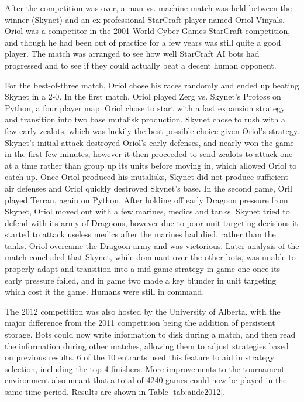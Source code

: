 \documentclass[journal]{IEEEtran}
\begin{document}
After the competition was over, a man vs. machine match was held between the winner (Skynet) and an
ex-professional StarCraft player named Oriol Vinyals. Oriol was a competitor in the 2001 World Cyber
Games StarCraft competition, and though he had been out of practice for a few years was still quite a
good player. The match was arranged to see how well StarCraft AI bots had progressed and to see if
they could actually beat a decent human opponent. 

For the best-of-three match, Oriol chose his races randomly and ended up beating Skynet in a 2-0. 
In the first match, Oriol played Zerg vs. Skynet's Protoss on Python, a four player map. Oriol chose
to start with a fast expansion strategy and transition into two base mutalisk production. Skynet chose
to rush with a few early zealots, which was luckily the best possible choice given Oriol's strategy.
Skynet's initial attack destroyed Oriol's early defenses, and nearly won the game in the first few
minutes, however it then proceeded to send zealots to attack one at a time rather than group up its
units before moving in, which allowed Oriol to catch up. Once Oriol produced his mutalisks, Skynet did
not produce sufficient air defenses and Oriol quickly destroyed Skynet's base. In the second game,
Oril played Terran, again on Python. After holding off early Dragoon pressure from Skynet, Oriol
moved out with a few marines, medics and tanks. Skynet tried to defend with its army of Dragoons,
however due to poor unit targeting decisions it started to attack useless medics after the marines
had died, rather than the tanks. Oriol overcame the Dragoon army and was victorious. Later analysis
of the match concluded that Skynet, while dominant over the other bots, was unable to properly
adapt and transition into a mid-game strategy in game one once its early pressure failed, and in game
two made a key blunder in unit targeting which cost it the game. Humans were still in command.

The 2012 competition was also hosted by the University of Alberta, with the major difference from the 2011
competition being the addition of persistent storage. Bots could now write information to disk during a
match, and then read the information during other matches, allowing them to adjust strategies based
on previous results. 6 of the 10 entrants used this feature to aid in strategy selection, including the
top 4 finishers. More improvements to the tournament environment also meant that a total of 4240 games
could now be played in the same time period. Results are shown in Table \ref{tab:aiide2012}.
\end{document}
